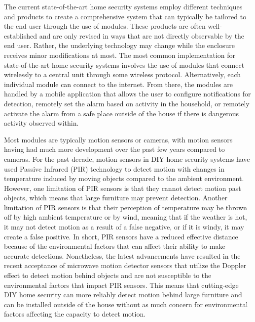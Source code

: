 \documentclass[conference]{IEEEtran}
\begin{document}
The current state-of-the-art home security systems employ different techniques and
products to create a comprehensive system that can typically be tailored to the end
user through the use of modules. These products are often well-established and are only
revised in ways that are not directly observable by the end user. Rather, the underlying
technology may change while the enclosure receives minor modifications at most.\cite{sarhan2020}
The most common implementation for state-of-the-art home security systems involves the
use of modules that connect wirelessly to a central unit through some wireless protocol.\cite{joseMalekian2017}
Alternatively, each individual module can connect to the internet.\cite{sarhan2020}
From there, the modules are handled by a mobile application that allows the user to
configure notifications for detection, remotely set the alarm based on activity in
the household, or remotely activate the alarm from a safe place outside of the house
if there is dangerous activity observed within.\cite{joseMalekian2017}

Most modules are typically motion sensors or cameras, with motion sensors having had
much more development over the past few years compared to cameras. For the past
decade, motion sensors in DIY home security systems have used
Passive Infrared (PIR) technology to detect motion with changes in temperature
induced by moving objects compared to the ambient environment.\cite{sarhan2020} However, one
limitation of PIR sensors is that they cannot detect motion past objects, which
means that large furniture may prevent detection. Another limitation of PIR sensors
is that their perception of temperature may be thrown off by high ambient temperature
or by wind, meaning that if the weather is hot, it may not detect motion as a result
of a false negative, or if it is windy, it may create a false positive.\cite{sarhan2020} In short,
PIR sensors have a reduced effective distance because of the environmental factors
that can affect their ability to make accurate detections. Nonetheless, the latest
advancements have resulted in the recent acceptance of microwave motion detector
sensors that utilize the Doppler effect to detect motion behind objects and are not
susceptible to the environmental factors that impact PIR sensors.\cite{sarhan2020} This means
that cutting-edge DIY home security can more reliably detect motion behind large
furniture and can be installed outside of the house without as much concern for
environmental factors affecting the capacity to detect motion.
\end{document}

